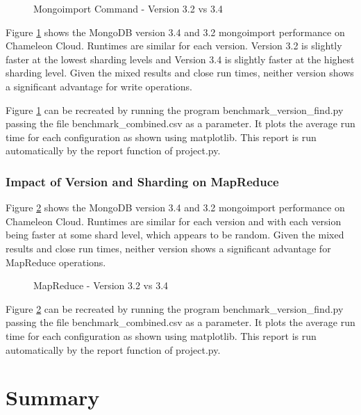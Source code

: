 \documentclass[9pt,twocolumn,twoside]{../../styles/osajnl}
\begin{document}
\begin{figure}[htbp]
\centering
{}
\caption{Mongoimport Command - Version 3.2 vs 3.4}
\label{fig:version-import}
\end{figure}


Figure \ref{fig:version-import} shows the MongoDB version 3.4 and 3.2
mongoimport performance on Chameleon Cloud. Runtimes are similar for
each version. Version 3.2 is slightly faster at the lowest sharding
levels and Version 3.4 is slightly faster at the highest sharding
level. Given the mixed results and close run times, neither version
shows a significant advantage for write operations.

Figure \ref{fig:version-import} can be recreated by running the
program benchmark\_version\_find.py passing the file
benchmark\_combined.csv as a parameter. It plots the average run time
for each configuration as shown using matplotlib. This report is run
automatically by the report function of project.py.



\subsubsection{Impact of Version and Sharding on MapReduce}

Figure \ref{fig:version-mapreduce} shows the MongoDB version 3.4 and
3.2 mongoimport performance on Chameleon Cloud. Runtimes are similar
for each version and with each version being faster at some shard
level, which appears to be random. Given the mixed results and close
run times, neither version shows a significant advantage for MapReduce
operations.

\begin{figure}[htbp]
\centering
{}
\caption{MapReduce - Version 3.2 vs 3.4}
\label{fig:version-mapreduce}
\end{figure}

Figure \ref{fig:version-mapreduce} can be recreated by running the
program benchmark\_version\_find.py passing the file
benchmark\_combined.csv as a parameter. It plots the average run time
for each configuration as shown using matplotlib. This report is run
automatically by the report function of project.py.



\section{Summary}
\end{document}
